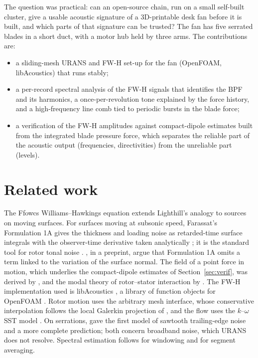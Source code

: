 \documentclass[11pt]{article}
\begin{document}
The question was practical: can an open-source chain, run on a small self-built cluster, give a usable acoustic
signature of a 3D-printable desk fan before it is built, and which parts of that signature can be trusted? The fan
has five serrated blades in a short duct, with a motor hub held by three arms. The contributions are:
\begin{itemize}
  \item a sliding-mesh URANS and FW-H set-up for the fan (OpenFOAM, libAcoustics) that runs stably;
  \item a per-record spectral analysis of the FW-H signals that identifies the BPF and its harmonics, a
    once-per-revolution tone explained by the force history, and a high-frequency line comb tied to periodic bursts
    in the blade force;
  \item a verification of the FW-H amplitudes against compact-dipole estimates built from the integrated blade
    pressure force, which separates the reliable part of the acoustic output (frequencies, directivities) from the
    unreliable part (levels).
\end{itemize}

\section{Related work}

The Ffowcs Williams--Hawkings equation \citep{ffowcswilliams1969} extends Lighthill's analogy to sources on moving
surfaces. For surfaces moving at subsonic speed, Farassat's Formulation 1A gives the thickness and loading noise as
retarded-time surface integrals with the observer-time derivative taken analytically \citep{farassat2007}; it is
the standard tool for rotor tonal noise \citep{brentner2003}. \citet{tao2026}, in a preprint, argue that
Formulation 1A omits a term linked to the variation of the surface normal. The field of a point force in motion,
which underlies the compact-dipole estimates of Section~\ref{sec:verif}, was derived by \citet{lowson1965}, and the
modal theory of rotor--stator interaction by \citet{tyler1962}. The FW-H implementation used is libAcoustics
\citep{epikhin2015,libacoustics}, a library of function objects for OpenFOAM \citep{weller1998,openfoam}. Rotor motion
uses the arbitrary mesh interface, whose conservative interpolation follows the local Galerkin projection of
\citet{farrell2011}, and the flow uses the $k$--$\omega$ SST model \citep{menter1994}. On serrations,
\citet{howe1991} gave the first model of sawtooth trailing-edge noise and \citet{lyu2016} a more complete
prediction; both concern broadband noise, which URANS does not resolve. Spectral estimation follows
\citet{harris1978} for windowing and \citet{welch1967} for segment averaging.
\end{document}

